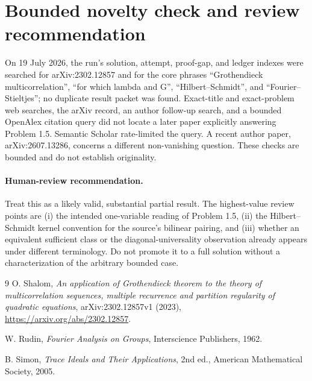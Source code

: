 \documentclass[11pt]{article}
\begin{document}
\section{Bounded novelty check and review recommendation}

On 19 July 2026, the run's solution, attempt, proof-gap, and ledger indexes
were searched for arXiv:2302.12857 and for the core phrases
``Grothendieck multicorrelation'', ``for which lambda and G'',
``Hilbert--Schmidt'', and ``Fourier--Stieltjes''; no duplicate result packet
was found.  Exact-title and exact-problem web searches, the arXiv record, an
author follow-up search, and a bounded OpenAlex citation query did not locate
a later paper explicitly answering Problem 1.5.  Semantic Scholar rate-limited
the query.  A recent author paper, arXiv:2607.13286, concerns a different
non-vanishing question.  These checks are bounded and do not establish
originality.

\paragraph{Human-review recommendation.}
Treat this as a likely valid, substantial partial result.  The highest-value
review points are (i) the intended one-variable reading of Problem 1.5,
(ii) the Hilbert--Schmidt kernel convention for the source's bilinear pairing,
and (iii) whether an equivalent sufficient class or the diagonal-universality
observation already appears under different terminology.  Do not promote it
to a full solution without a characterization of the arbitrary bounded case.

\begin{thebibliography}{9}
O. Shalom,
\emph{An application of Grothendieck theorem to the theory of multicorrelation
sequences, multiple recurrence and partition regularity of quadratic
equations}, arXiv:2302.12857v1 (2023),
\url{https://arxiv.org/abs/2302.12857}.

W. Rudin,
\emph{Fourier Analysis on Groups},
Interscience Publishers, 1962.

B. Simon,
\emph{Trace Ideals and Their Applications}, 2nd ed.,
American Mathematical Society, 2005.
\end{thebibliography}
\end{document}
